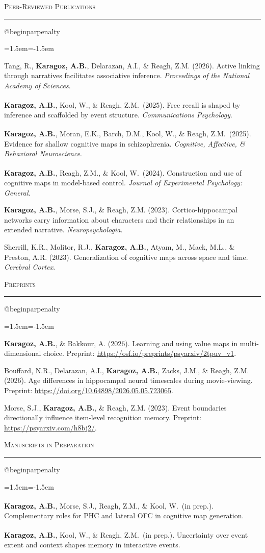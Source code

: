 \documentclass[11pt,letterpaper]{article}
\makeatletter
\newif\ifcvafterhead
\newcommand{\cvsection}[1]{%
  \par\vspace{10pt}%
  {\scshape #1}\par\nopagebreak\vspace{-6pt}%
  \noindent\rule{\textwidth}{0.4pt}\par\nopagebreak\vspace{6pt}%
  \global\cvafterheadtrue}
\newenvironment{cvrefs}
  {\csname @beginparpenalty\endcsname=10000 
   \begin{list}{}{\leftmargin=1.5em\itemindent=-1.5em\itemsep=5pt\topsep=0pt\parsep=0pt}}
  {\end{list}\vspace{2pt}}
\newcommand{\me}{\textbf{Karagoz, A.B.}}
\newcommand{\eq}{\textsuperscript{\dag}}   %
\newcommand{\note}[1]{\vspace{2pt}{\itshape #1\par}}
\makeatother
\begin{document}
\cvsection{Peer-Reviewed Publications}
\begin{cvrefs}
\item Tang, R., \me, Delarazan, A.I., \& Reagh, Z.M. (2026). Active linking through narratives
  facilitates associative inference. \emph{Proceedings of the National Academy of Sciences}.
\item \me, Kool, W.\eq, \& Reagh, Z.M.\eq\ (2025). Free recall is shaped by inference and scaffolded
  by event structure. \emph{Communications Psychology}.
\item \me, Moran, E.K., Barch, D.M., Kool, W.\eq, \& Reagh, Z.M.\eq\ (2025). Evidence for shallow
  cognitive maps in schizophrenia. \emph{Cognitive, Affective, \& Behavioral Neuroscience}.
\item \me, Reagh, Z.M.\eq, \& Kool, W.\eq\ (2024). Construction and use of cognitive maps in
  model-based control. \emph{Journal of Experimental Psychology: General}.
\item \me, Morse, S.J., \& Reagh, Z.M. (2023). Cortico-hippocampal networks carry information
  about characters and their relationships in an extended narrative. \emph{Neuropsychologia}.
\item Sherrill, K.R., Molitor, R.J., \me, Atyam, M., Mack, M.L., \& Preston, A.R. (2023).
  Generalization of cognitive maps across space and time. \emph{Cerebral Cortex}.
\end{cvrefs}
\note{\dag\ denotes equal contribution.}

\cvsection{Preprints}
\begin{cvrefs}
\item \me, \& Bakkour, A. (2026). Learning and using value maps in multi-dimensional choice.
  Preprint: \url{https://osf.io/preprints/psyarxiv/2tpuv_v1}.
\item Bouffard, N.R., Delarazan, A.I., \me, Zacks, J.M., \& Reagh, Z.M. (2026). Age differences
  in hippocampal neural timescales during movie-viewing. Preprint:
  \url{https://doi.org/10.64898/2026.05.05.723065}.
\item Morse, S.J., \me, \& Reagh, Z.M. (2023). Event boundaries directionally influence
  item-level recognition memory. Preprint: \url{https://psyarxiv.com/h8bj2/}.
\end{cvrefs}

\cvsection{Manuscripts in Preparation}
\begin{cvrefs}
\item \me, Morse, S.J., Reagh, Z.M.\eq, \& Kool, W.\eq\ (in prep.). Complementary roles for PHC and lateral
  OFC in cognitive map generation.
\item \me, Kool, W.\eq, \& Reagh, Z.M.\eq\ (in prep.). Uncertainty over event extent and context shapes
  memory in interactive events.
\end{cvrefs}
\end{document}
